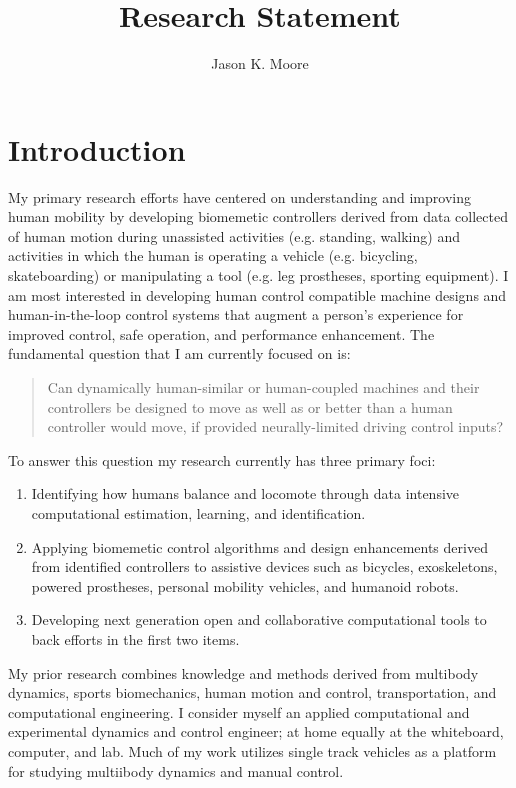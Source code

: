 \documentclass{article}
\title{Research Statement}
\author{Jason K. Moore}
\date{}
\begin{document}
\maketitle

\section*{Introduction}
%
My primary research efforts have centered on understanding and improving human
mobility by developing biomemetic controllers derived from data collected of
human motion during unassisted activities (e.g. standing, walking) and
activities in which the human is operating a vehicle (e.g. bicycling,
skateboarding) or manipulating a tool (e.g. leg prostheses, sporting
equipment). I am most interested in developing human control compatible machine
designs and human-in-the-loop control systems that augment a person's
experience for improved control, safe operation, and performance enhancement.
The fundamental question that I am currently focused on is:
%
\begin{quote}
 Can dynamically human-similar or human-coupled machines and their controllers
 be designed to move as well as or better than a human controller would move,
 if provided neurally-limited driving control inputs?
\end{quote}

To answer this question my research currently has three primary foci:
%
\begin{enumerate}
  \item Identifying how humans balance and locomote through data intensive
    computational estimation, learning, and identification.
  \item Applying biomemetic control algorithms and design enhancements derived
    from identified controllers to assistive devices such as bicycles,
    exoskeletons, powered prostheses, personal mobility vehicles, and humanoid
    robots.
  \item Developing next generation open and collaborative computational tools
    to back efforts in the first two items.
 \end{enumerate}

My prior research combines knowledge and methods derived from multibody
dynamics, sports biomechanics, human motion and control, transportation, and
computational engineering. I consider myself an applied computational and
experimental dynamics and control engineer; at home equally at the whiteboard,
computer, and lab. Much of my work utilizes single track vehicles as a platform
for studying multiibody dynamics and manual control.
\end{document}
